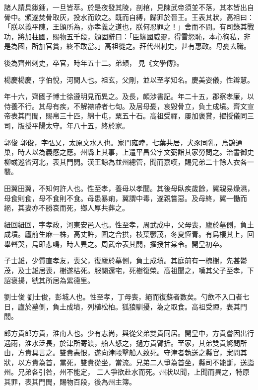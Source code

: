 \begin{pinyinscope}
 諸人請具鍬鍤，一旦皆萃。於是夜發其陵，剖棺，見陳武帝須並不落，其本皆出自骨中。頒遂焚骨取灰，投水而飲之。既而自縛，歸罪於晉王。王表其狀，高祖曰：「朕以義平陳，王頒所為，亦孝義之道也，朕何忍罪之！」舍而不問。有司錄其戰功，將加柱國，賜物五千段，頒固辭曰：「臣緣國威靈，得雪怨恥，本心徇私，非是為國，所加官賞，終不敢當。」高祖從之。拜代州刺史，甚有惠政。母憂去職。



 後為齊州刺史，卒官，時年五十二。弟頍，
 見《文學傳》。



 楊慶楊慶，字伯悅，河間人也。祖玄，父剛，並以至孝知名。慶美姿儀，性辯慧。



 年十六，齊國子博士徐遵明見而異之。及長，頗涉書記。年二十五，郡察孝廉，以侍養不行。其母有疾，不解襟帶者七旬。及居母憂，哀毀骨立，負土成墳。齊文宣帝表其門閭，賜帛三十匹，綿十屯，粟五十石。高祖受禪，屢加褒賞，擢授儀同三司，版授平陽太守。年八十五，終於家。



 郭俊
 郭俊，字弘乂，太原文水人也。家門雍睦，七葉共居，犬豕同乳，烏鵲通巢，時人以為義感之應。州縣上其事，上遣平昌公宇文弼詣其家勞問之。治書御史柳彧巡省河北，表其門閭。漢王諒為並州總管，聞而嘉嘆，賜兄弟二十餘人衣各一襲。



 田翼田翼，不知何許人也。性至孝，養母以孝聞。其後母臥疾歲餘，翼親易燥濕，母食則食，母不食則不食。母患暴痢，翼謂中毒，遂親嘗惡。及母終，翼一慟而絕，其妻亦不勝哀而死，鄉人厚共葬之。



 紐回紐回，字孝政，河東安邑人也。性至孝，周武成中，父母喪，廬於墓側，負土成墳。廬前生麻一株，高丈許，圍之合拱，枝葉鬱茂，冬夏恆青。有烏棲其上，回舉聲哭，烏即悲鳴，時人異之。周武帝表其閭，擢授甘棠令。開皇初卒。



 子士雄，少質直孝友，喪父，復廬於墓側，負土成墳。其庭前有一槐樹，先甚鬱茂，及士雄居喪，樹遂枯死。服闋還宅，死樹復榮。高祖聞之，嘆其父子至孝，下詔褒揚，號其所居為累德里。



 劉士俊
 劉士俊，彭城人也。性至孝，丁母喪，絕而復蘇者數矣。勺飲不入口者七日，廬於墓側，負土成墳，列植松柏。狐狼馴擾，為之取食。高祖受禪，表其門閭。



 郎方貴郎方貴，淮南人也。少有志尚，與從父弟雙貴同居。開皇中，方貴嘗因出行遇雨，淮水泛長，於津所寄渡，船人怒之，撾方貴臂折。至家，其弟雙貴驚問所由，方貴具言之。雙貴恚恨，遂向津毆擊船人致死。守津者執送之縣官，案問其狀，以方貴為首，當死，雙貴從坐，當流。兄弟二人爭為首坐，縣司不能斷，送詣州。兄弟各引咎，州不能定，
 二人爭欲赴水而死。州狀以聞，上聞而異之，特原其罪，表其門閭，賜物百段，後為州主簿。




\end{pinyinscope}
